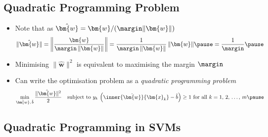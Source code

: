 \begin{slide}
\section{Quadratic Programming Problem}

\begin{PauseHighLight}
  \begin{itemize}
  \item Note that as $\hat{\bm{w}}=\bm{w}/(\margin\|\bm{w}\|)$
    \begin{align*}
      \| \hat{\bm{w}} \| = \left\|\frac{\bm{w}}{\margin\,\|\bm{w}\|}\right\|
      = \frac{1}{\margin\,\|\bm{w}\|} \, \|\bm{w}\| \pause
      = \frac{1}{\margin}\pause
    \end{align*}
  \item Minimising $\| \hat{\bm{w}} \|^2$ is equivalent to maximising the
    margin $\margin$\pause
  \item Can write the optimisation problem as a \textit{quadratic
      programming problem}
    \begin{align*}
      \min_{\hat{\bm{w}},\,\hat{b}} \frac{\|\hat{\bm{w}}\|^2}{2} \quad 
      \mbox{subject to $y_k\,\left( \inner{\hat{\bm{w}}}{\bm{x}_k} -
      \hat{b}\right) \geq 1$ for all $k=1,\,2,\,\ldots,\,m$}\pause
    \end{align*}
  \end{itemize}
\end{PauseHighLight}

\end{slide}



\begin{slide}
\section[-2]{Quadratic Programming in SVMs}

\pb\pause{}
\begin{center}
  \pause
\end{center}
\end{slide}



